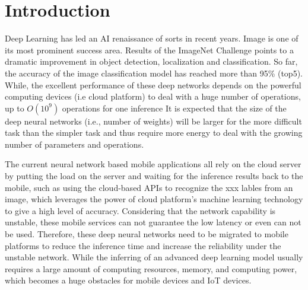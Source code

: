 \section{Introduction}

Deep Learning has led an AI renaissance of sorts in recent years.
Image is one of its most prominent success area.
Results of the ImageNet Challenge points to a dramatic
improvement in object detection, localization and classification.
So far, the accuracy of the image classification model
has reached more than 95\% (top5)\FIXME{\cite{}}.
While, the excellent performance of these deep networks
depends on the powerful computing devices (i.e cloud platform)
to deal with a huge number of operations, up to $O(10^9)$ operations
for one inference 
It is expected that the size of the deep neural networks (i.e., number
of weights) will be larger for the more
difficult task than the simpler task and thus require
more energy to deal with the growing number of parameters and operations.


The current neural network based mobile
applications all rely on the cloud server
by putting the load on the server and waiting
for the inference results back to the mobile,
such as  using the cloud-based APIs
to recognize the xxx lables from an image,
which leverages the power of cloud platform's machine learning
technology to give a high level of accuracy.
Considering that the network capability is unstable,
these mobile services can not guarantee the low latency 
or even can not be used.
Therefore, these deep neural networks
need to be migrated to mobile platforms to reduce the
inference time and increase the reliability under the unstable network.
While the inferring of
an advanced deep learning model usually requires
a large amount of computing resources, memory,
and computing power, which becomes a huge
obstacles for mobile devices and IoT devices.

